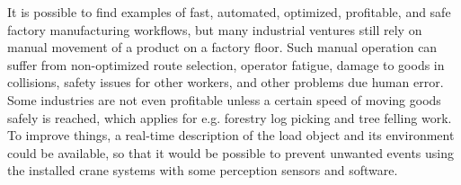 \documentclass[12pt,a4paper,oneside,pdftex]{report}
\begin{document}



It is possible to find examples of fast, automated, optimized, profitable, and safe factory manufacturing workflows, but many industrial ventures still rely on manual movement of a product on a factory floor. Such manual operation can suffer from non-optimized route selection, operator fatigue, damage to goods in collisions, safety issues for other workers, and other problems due human error. Some industries are not even profitable unless a certain speed of moving goods safely is reached, which applies for e.g. forestry log picking and tree felling work. To improve things, a real-time description of the load object and its environment could be available, so that it would be possible to prevent unwanted events using the installed crane systems with some perception sensors and software.
\end{document}

